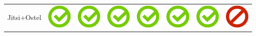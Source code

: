 \documentclass[10pt,foldmark,tumble]{leaflet}
\begin{document}
\begin{center}
{{\begin{tabular}{ L{2cm} | C{2cm} | C{2cm} | C{2cm} | C{2cm} | C{2cm} | C{2cm} | C{2cm} }
Jitsi+Ostel  & \includegraphics[scale=0.1]{pics/haken.png} & \includegraphics[scale=0.1]{pics/haken.png} & \includegraphics[scale=0.1]{pics/haken.png} & \includegraphics[scale=0.1]{pics/haken.png} & \includegraphics[scale=0.1]{pics/haken.png} & \includegraphics[scale=0.1]{pics/haken.png} & \includegraphics[scale=0.1]{pics/nohaken.png} \tabularnewline

\end{tabular}}}
\end{center}
\end{document}
